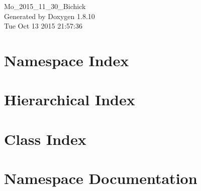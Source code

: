 \documentclass[twoside]{book}
\newcommand{\+}{\discretionary{\mbox{\scriptsize$\hookleftarrow$}}{}{}}
\newcommand{\clearemptydoublepage}{%
  \newpage{\pagestyle{empty}\cleardoublepage}%
}
\begin{document}
\hypersetup{pageanchor=false,
             bookmarks=true,
             bookmarksnumbered=true,
             pdfencoding=unicode
            }
\begin{titlepage}
\vspace*{7cm}
\begin{center}%
{\Large Mo\+\_\+2015\+\_\+11\+\_\+30\+\_\+\+Bichick }\\
\vspace*{1cm}
{\large Generated by Doxygen 1.8.10}\\
\vspace*{0.5cm}
{\small Tue Oct 13 2015 21:57:36}\\
\end{center}
\end{titlepage}
\clearemptydoublepage
\tableofcontents
\clearemptydoublepage
{}
\hypersetup{pageanchor=true}

\chapter{Namespace Index}

\chapter{Hierarchical Index}

\chapter{Class Index}

\chapter{Namespace Documentation}


\end{document}
